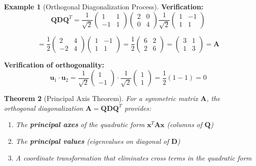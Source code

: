 \documentclass[12pt]{article}
\numberwithin{equation}{section}
\newcommand{\vect}[1]{\boldsymbol{#1}}   %
\newcommand{\mat}[1]{\mathbf{#1}}        %
\theoremstyle{plain}
\newtheorem{theorem}{Theorem}[section]
\theoremstyle{definition}
\newtheorem{example}[theorem]{Example}
\theoremstyle{remark}
\begin{document}
\begin{example}[Orthogonal Diagonalization Process]
\textbf{Verification:}
$$\mat{Q}\mat{D}\mat{Q}^T = \frac{1}{\sqrt{2}}\begin{pmatrix} 1 & 1 \\ -1 & 1 \end{pmatrix}\begin{pmatrix} 2 & 0 \\ 0 & 4 \end{pmatrix}\frac{1}{\sqrt{2}}\begin{pmatrix} 1 & -1 \\ 1 & 1 \end{pmatrix}$$

$$= \frac{1}{2}\begin{pmatrix} 2 & 4 \\ -2 & 4 \end{pmatrix}\begin{pmatrix} 1 & -1 \\ 1 & 1 \end{pmatrix} = \frac{1}{2}\begin{pmatrix} 6 & 2 \\ 2 & 6 \end{pmatrix} = \begin{pmatrix} 3 & 1 \\ 1 & 3 \end{pmatrix} = \mat{A}$$ \checkmark

\textbf{Verification of orthogonality:}
$$\vect{u}_1 \cdot \vect{u}_2 = \frac{1}{\sqrt{2}}\begin{pmatrix} 1 \\ -1 \end{pmatrix} \cdot \frac{1}{\sqrt{2}}\begin{pmatrix} 1 \\ 1 \end{pmatrix} = \frac{1}{2}(1 - 1) = 0$$ \checkmark
\end{example}

\begin{theorem}[Principal Axis Theorem]
For a symmetric matrix $\mat{A}$, the orthogonal diagonalization $\mat{A} = \mat{Q}\mat{D}\mat{Q}^T$ provides:
\begin{enumerate}
\item The \textbf{principal axes} of the quadratic form $\vect{x}^T\mat{A}\vect{x}$ (columns of $\mat{Q}$)
\item The \textbf{principal values} (eigenvalues on diagonal of $\mat{D}$)
\item A coordinate transformation that eliminates cross terms in the quadratic form
\end{enumerate}
\end{theorem}
\end{document}
